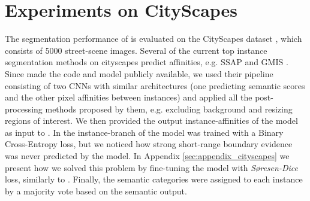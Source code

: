 


\section{Experiments on CityScapes}\label{sec:cityscapes_exp}
The segmentation performance of \algname{} is evaluated on the CityScapes dataset \cite{cordts2016cityscapes}, which consists of 5000 street-scene images.
Several of the current top instance segmentation methods on cityscapes predict affinities, e.g. SSAP \cite{Gao_2019_ICCV} and GMIS \cite{liu2018affinity}. 
Since \cite{liu2018affinity} made the code and model publicly available, we used their pipeline consisting of two CNNs with similar architectures (one predicting semantic scores and the other pixel affinities between instances) and applied all the post-processing methods proposed by them, e.g. excluding background and resizing regions of interest. We then provided the output instance-affinities of the model as input to \algname{}. 
In \cite{liu2018affinity} the instance-branch of the model was trained with a Binary Cross-Entropy loss, but we noticed how strong short-range boundary evidence was never predicted by the model. In Appendix \ref{sec:appendix_cityscapes} we present how we solved this problem by fine-tuning the model with \emph{S\o resen-Dice} loss, similarly to \cite{wolf2018mutex}. Finally, the semantic categories were assigned to each instance by a majority vote based on the semantic output. 

